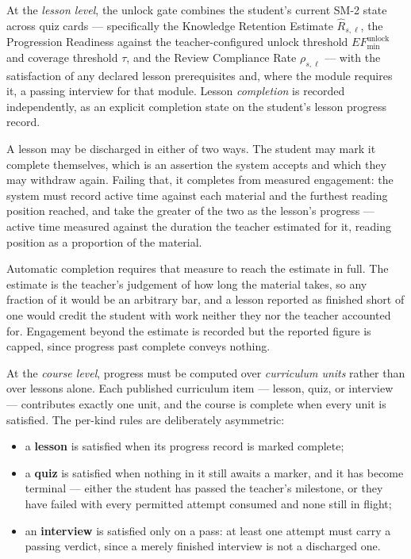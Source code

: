 At the \textit{lesson level}, the unlock gate combines the student's
current SM-2 state across quiz cards — specifically the Knowledge
Retention Estimate $\hat{R}_{s,\ell}$, the Progression Readiness
against the teacher-configured unlock threshold
$EF_{\min}^{\text{unlock}}$ and coverage threshold $\tau$, and the
Review Compliance Rate $\rho_{s,\ell}$ — with the satisfaction of any
declared lesson prerequisites and, where the module requires it, a
passing interview for that module. Lesson \textit{completion} is
recorded independently, as an explicit completion state on the
student's lesson progress record.

A lesson may be discharged in either of two ways. The student may mark
it complete themselves, which is an assertion the system accepts and
which they may withdraw again. Failing that, it completes from
measured engagement: the system must record active time against each
material and the furthest reading position reached, and take the
greater of the two as the lesson's progress — active time measured
against the duration the teacher estimated for it, reading position as
a proportion of the material.

Automatic completion requires that measure to reach the estimate in
full. The estimate is the teacher's judgement of how long the material
takes, so any fraction of it would be an arbitrary bar, and a lesson
reported as finished short of one would credit the student with work
neither they nor the teacher accounted for. Engagement beyond the
estimate is recorded but the reported figure is capped, since progress
past complete conveys nothing.

At the \textit{course level}, progress must be computed over
\textit{curriculum units} rather than over lessons alone. Each
published curriculum item — lesson, quiz, or interview — contributes
exactly one unit, and the course is complete when every unit is
satisfied. The per-kind rules are deliberately asymmetric:

\begin{itemize}
    \item a \textbf{lesson} is satisfied when its progress record is
    marked complete;
    \item a \textbf{quiz} is satisfied when nothing in it still
    awaits a marker, and it has become terminal — either the student
    has passed the teacher's milestone, or they have failed with every
    permitted attempt consumed and none still in flight;
    \item an \textbf{interview} is satisfied only on a pass: at least
    one attempt must carry a passing verdict, since a merely finished
    interview is not a discharged one.
\end{itemize}

